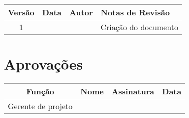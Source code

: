 \begin{table}[H]
	\begin{tabularx}{\textwidth}{| c | c | X | X |}
		\hline
		\textbf{Versão} & \textbf{Data} & \textbf{Autor}      & \textbf{Notas de Revisão} \\
		\hline
		1                &               & \projectManagerName & Criação do documento     \\
		\hline
	\end{tabularx}
	\centering
\end{table}

\section{Aprovações}

\begin{table}[H]
	\begin{tabularx}{\textwidth}{| c | c | X | c |}
		\hline
		\textbf{Função}  & \textbf{Nome}       & \textbf{Assinatura}      & \textbf{Data} \\
		\hline
		Gerente de projeto & \projectManagerName & \projectManagerSignature &               \\
		\hline
	\end{tabularx}
	\centering
\end{table}